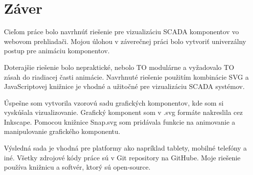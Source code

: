 \chapter*{Záver}

Cieľom práce bolo navrhnúť riešenie pre vizualizáciu SCADA komponentov vo webovom prehliadači. Mojou úlohou v záverečnej práci bolo vytvoriť univerzálny postup pre animáciu komponentov. 

Doterajšie riešenie bolo nepraktické, nebolo TO modulárne a vyžadovalo TO zásah do riadiacej časti animácie. Navrhnuté riešenie použitím kombinácie SVG a JavaScriptovej knižnice je vhodné a užitočné pre vizualizáciu SCADA systémov. 

Úspešne som vytvorila vzorovú sadu grafických komponentov, kde som si vyskúšala vizualizovanie. 
Grafický komponent som v .svg formáte nakreslila cez Inkscape. Pomocou knižnice Snap.svg som pridávala funkcie na animovanie a manipulovanie grafického komponentu. 

Výsledná sada je vhodná pre platformy ako napríklad tablety, mobilné telefóny a iné. 
Všetky zdrojové kódy práce sú v Git repository na GitHube. Moje riešenie používa knižnicu a softvér, ktorý sú open-source.